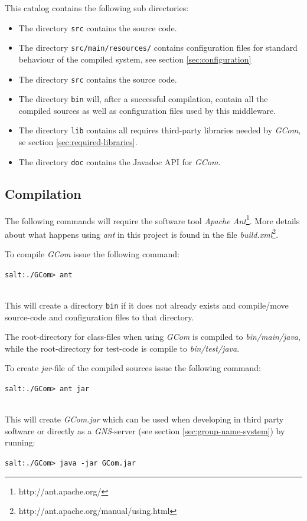 \documentclass[titlepage, twocolumn, a4paper, 10pt]{article}
\begin{document}
This catalog contains the following sub directories:
\begin{itemize}
\item The directory \verb!src! contains the source code.
\item The directory \verb!src/main/resources/! contains configuration
  files for standard behaviour of the compiled system, see section
  \ref{sec:configuration}
\item The directory \verb!src! contains the source code.
\item The directory \verb!bin! will, after a successful compilation,
  contain all the compiled sources as well as configuration files used
  by this middleware.
\item The directory \verb!lib! contains all requires third-party libraries
  needed by \textit{GCom}, se section \ref{sec:required-libraries}.
\item The directory \verb!doc! contains the Javadoc API for \textit{GCom}.
\end{itemize}

\subsection{Compilation}\label{sec:compilation}
The following commands will require the software tool \textit{Apache
  Ant}\footnote{http://ant.apache.org/}. More details about what
happens using \textit{ant} in this project is found in the file
\textit{build.xml}\footnote{http://ant.apache.org/manual/using.html}.

To compile \textit{GCom} issue the following command:\\
\begin{footnotesize}
  \verb!salt:./GCom> ant!
\end{footnotesize}\\
This will create a directory \verb!bin! if it does not already exists
and compile/move source-code and configuration files to that
directory.

The root-directory for class-files when using \textit{GCom} is
compiled to \textit{bin/main/java}, while the root-directory for
test-code is compile to \textit{bin/test/java}.

To create \textit{jar}-file of the compiled sources issue the
following command:\\
\begin{footnotesize}
  \verb!salt:./GCom> ant jar!
\end{footnotesize}\\
This will create \textit{GCom.jar} which can be used when developing
in third party software or directly as a \textit{GNS}-server (see
section \ref{sec:group-name-system}) by
running:\\
\begin{footnotesize}
  \verb!salt:./GCom> java -jar GCom.jar!
\end{footnotesize}
\end{document}
